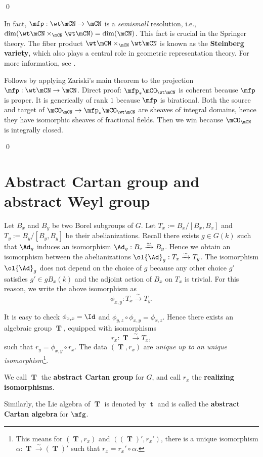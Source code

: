 	\qed

	\begin{rem}
		In fact, $\mfp:\wt\mCN \to \mCN$ is a \emph{semismall} resolution, i.e., $\dim(\wt\mCN\mt_\mCN\wt\mCN) = \dim(\mCN)$. This fact is crucial in the Springer theory. The fiber product $\wt\mCN\mt_\mCN\wt\mCN$ is known as the \textbf{Steinberg variety}, which also plays a central role in geometric representation theory. For more information, see \cite{CG}.
	\end{rem}


		Follows by applying Zariski's main theorem to the projection $\mfp: \wt\mCN \to \mCN$. Direct proof: $\mfp_* \mCO_{\wt\mCN}$ is coherent because $\mfp$ is proper. It is generically of rank $1$ because $\mfp$ is birational. Both the source and target of $\mCO_\mCN\to \mfp_* \mCO_{\wt\mCN}$ are sheaves of integral domains, hence they have isomorphic sheaves of fractional fields. Then we win because $\mCO_\mCN$ is integrally closed.

	\qed


	\appendix

	\section{Abstract Cartan group and abstract Weyl group}
	\label{app-abs}

	\begin{constr}
		Let $B_x$ and $B_y$ be two Borel subgroups of $G$. Let $T_x:=B_x/[B_x,B_x]$ and $T_y:=B_y/[B_y,B_y]$ be their abelianizations. Recall there exists $g\in G(k)$ such that $\Ad_g$ induces an isomorphism $\Ad_g: B_x \xrightarrow{\simeq} B_y$. Hence we obtain an isomorphism between the abelianizations $\ol{\Ad}_g: T_x \xrightarrow{\simeq} T_y$.
		The isomorphism $\ol{\Ad}_g$ does not depend on the choice of $g$ because any other choice $g'$ satisfies $g'\in g B_x(k)$ and the adjoint action of $B_x$ on $T_x$ is trivial. For this reason, we write the above isomorphism as
		\[
			\phi_{x,y}: T_x \xrightarrow{\sim} T_y.
		\]

		It is easy to check $\phi_{x,x}=\Id$ and $\phi_{y,z}\circ \phi_{x,y}=\phi_{x,z}$. Hence there exists an algebraic group $\mbfT$, equipped with isomorphisms
		\[
			r_x: \mbfT \xrightarrow{\sim} T_x,
		\]
		such that $r_y = \phi_{x,y}\circ r_x$. The data $(\mbfT, r_x)$ are \emph{unique up to an unique isomorphism}\footnote{This means for $(\mbfT, r_x)$ and $((\mbfT)', r_x')$, there is a unique isomorphism $\alpha:\mbfT \xrightarrow{\sim} (\mbfT)'$ such that $r_x= r_x'\circ \alpha$.}.

		We call $\mbfT$ the \textbf{abstract Cartan group} for $G$, and call $r_x$ the \textbf{realizing isomorphisms}.

		Similarly, the Lie algebra of $\mbfT$ is denoted by $\mbft$ and is called the \textbf{abstract Cartan algebra} for $\mfg$.
	\end{constr}

